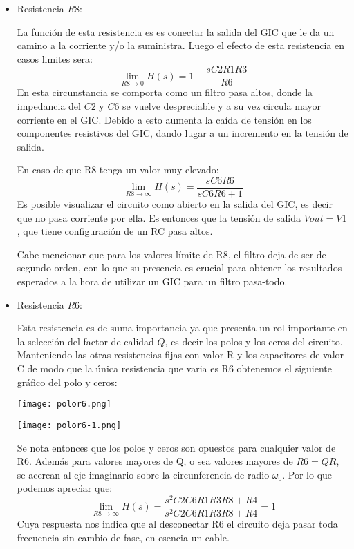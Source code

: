 \begin{itemize}
    \item Resistencia $R8$:
    
    La función de esta resistencia es es conectar la salida del GIC que le da un camino a la corriente y/o la suministra. Luego el efecto de esta resistencia en casos limites sera:
    $$\lim_{R8 \longrightarrow 0} H(s) = 1 - \frac{sC2R1R3}{R6}$$
    En esta circunstancia se comporta como un filtro pasa altos, donde la impedancia del $C2$ y $C6$ se vuelve despreciable y a su vez  circula mayor corriente en el GIC. Debido a esto aumenta la caída de tensión en los componentes resistivos del GIC, dando lugar a un incremento en la tensión de salida. 
    
    En caso de que R8 tenga un valor muy elevado:
    $$\lim_{R8\longrightarrow\infty} H(s) = \frac{sC6R6}{sC6R6 + 1}$$
    Es posible visualizar el circuito como abierto en la salida del GIC, es decir que no pasa corriente por ella. Es entonces que la tensión de salida $Vout = V1$, que tiene configuración de un RC pasa altos. 
    
    Cabe mencionar que para los valores límite de R8, el filtro deja de ser de segundo orden, con lo que su presencia es crucial para obtener los resultados esperados a la hora de utilizar un GIC para un filtro pasa-todo.
    
    \item Resistencia $R6$:
    
    Esta resistencia es de suma importancia ya que presenta un rol importante en la selección del factor de calidad $Q$, es decir los polos y los ceros del circuito. Manteniendo las otras resistencias fijas con valor R y los capacitores de valor C de modo que la única resistencia que varia es R6 obtenemos el siguiente gráfico del polo y ceros:
    
    \begin{minipage}{\textwidth}
    \centering
    \texttt{[image: polor6.png]}
    \end{minipage}
    \begin{minipage}{\textwidth}
    \centering
    \texttt{[image: polor6-1.png]}
    \end{minipage}
    
    Se nota entonces que los polos y ceros son opuestos para cualquier valor de R6. Además para valores mayores de Q, o sea valores mayores de $R6 = QR$, se acercan al eje imaginario sobre la circunferencia de radio $\omega_0$. Por lo que podemos apreciar que:
    $$\lim_{R8\longrightarrow\infty} H(s) = \frac{s^2C2C6R1R3R8 + R4}{s^2C2C6R1R3R8 + R4} = 1$$
    Cuya respuesta nos indica que al desconectar R6 el circuito deja pasar toda frecuencia sin cambio de fase, en esencia un cable. 
    

\end{itemize}
